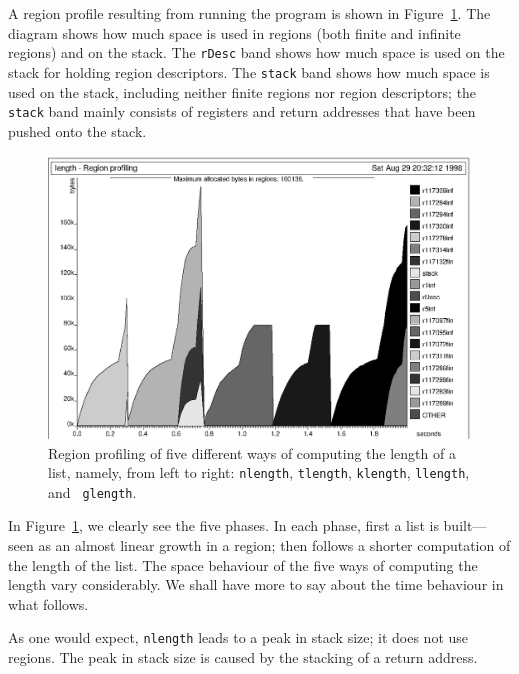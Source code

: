 \documentclass[12pt]{book}
\begin{document}
A region profile resulting from running the program is shown in
Figure~\ref{length.region.fig}.  The diagram shows how much space is
used in regions (both finite and infinite regions) and on the stack.
The
%
{\tt rDesc} band shows how much space is used on the stack for holding
region descriptors. The
%
{\tt stack} band shows how much space is used on the stack, including
neither finite regions nor region descriptors; the {\tt stack} band
mainly consists of registers and return addresses that have been
pushed onto the stack.
\begin{figure}
\begin{center}
\includegraphics{length.region.ps}
\end{center}
\caption{Region profiling of five different
  ways of computing the length of a list, namely, from left to right:
  {\tt nlength}, {\tt tlength}, {\tt klength}, {\tt llength}, and {\tt
    glength}.}
\label{length.region.fig}
\end{figure}

In Figure~\ref{length.region.fig}, we clearly see the five phases.  In
each phase, first a list is built---seen as an almost linear growth in
a region; then follows a shorter computation of the length of the
list.  The space behaviour of the five ways of computing the length
vary considerably. We shall have more to say about the time behaviour
in what follows.

As one would expect, {\tt nlength} leads to a peak in stack size; it
does not use regions. The peak in stack size is caused by the stacking
of a return address.
\end{document}

